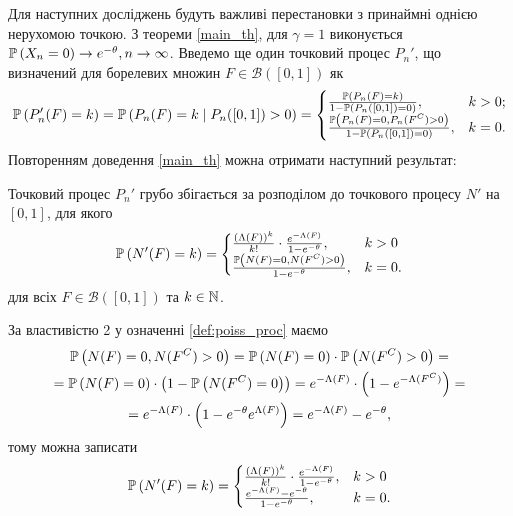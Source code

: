 Для наступних досліджень будуть важливі перестановки з принаймні однією нерухомою точкою.
З теореми \ref{main_th}, для $\gamma = 1$ виконується $\P{X_n = 0} \to e^{-\theta}, n \to \infty$. 
Введемо ще один точковий процес $P_n'$, що визначений для борелевих множин $F \in \mathcal{B}([0, 1])$ як 
\begin{gather}
    \P{P_n' (F) = k} = \P{P_n(F) = k \mid P_n([0, 1]) > 0} = \begin{cases}
        \frac{\P{P_n(F) = k}}{1 - \P{P_n([0, 1]) = 0}}, & k > 0; \\
        \frac{\P{P_n(F) = 0, P_n(F^C) > 0}}{1 - \P{P_n([0, 1]) = 0}}, & k = 0.
    \end{cases} 
\end{gather}
Повторенням доведення \ref{main_th} можна отримати наступний результат:
\begin{theorem}\label{cond_th}
    Точковий процес $P_n'$ грубо збігається за розподілом до точкового процесу $N'$ на $[0, 1]$, 
    для якого
    \begin{gather}
        \P{N' (F) = k} =
        \begin{cases}
            \frac{(\Lambda(F))^k}{k!} \cdot \frac{e^{-\Lambda(F)}}{1 - e^{-\theta}}, & k > 0 \\
            \frac{\P{N(F) = 0, N(F^C) > 0}}{1 - e^{-\theta}}, & k = 0.
        \end{cases}
    \end{gather}
    для всіх $F \in \mathcal{B}([0, 1])$ та $k \in \N$.
\end{theorem}
За властивістю 2 у означенні \ref{def:poiss_proc} маємо
\begin{gather*}
    \P{N(F) = 0, N(F^C) > 0} = \P{N(F) = 0}\cdot \P{N(F^C) > 0} = \\ =
    \P{N(F) = 0} \cdot \left(1 - \P{N(F^C) = 0}\right) = 
    e^{-\Lambda(F)} \cdot \left(1 - e^{-\Lambda(F^C)}\right) = \\ =
    e^{-\Lambda(F)} \cdot \left(1 - e^{-\theta} e^{\Lambda(F)}\right) = 
    e^{-\Lambda(F)} - e^{-\theta},
\end{gather*}
тому можна записати
\begin{gather}
    \P{N' (F) = k} =
    \begin{cases}
        \frac{(\Lambda(F))^k}{k!} \cdot \frac{e^{-\Lambda(F)}}{1 - e^{-\theta}}, & k > 0 \\
        \frac{e^{-\Lambda(F)} - e^{-\theta}}{1 - e^{-\theta}}, & k = 0.
    \end{cases}
\end{gather}

